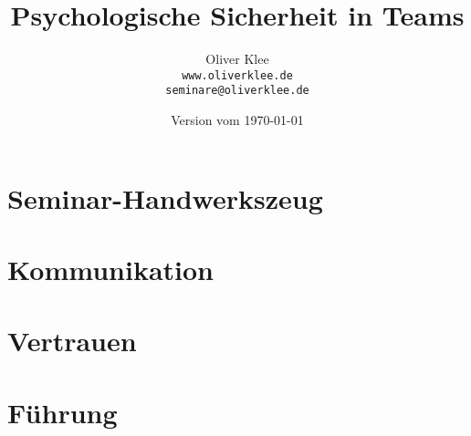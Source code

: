 \documentclass[a4paper,openany,twoside,titlepage,10pt,headsepline]{scrbook}
\title{ Psychologische Sicherheit in Teams }
\author{Oliver Klee\\\texttt{www.oliverklee.de}\\\texttt{seminare@oliverklee.de}}
\date{Version vom \today}
\begin{document}
\frontmatter

\maketitle

\tableofcontents


\mainmatter

\chapter{Seminar-Handwerkszeug}



\chapter{Kommunikation}




\chapter{Vertrauen}



\chapter{Führung}




\backmatter





\printindex
\end{document}
